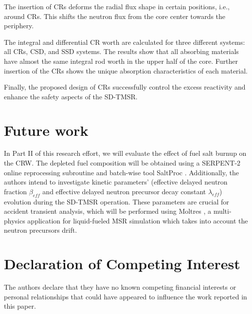The insertion of CRs deforms the radial flux shape in certain positions, i.e., around CRs. This shifts the neutron flux from the core center towards the periphery.

The integral and differential CR worth are calculated for three 
different systems: all CRs, CSD, and SSD systems. The results show 
that all absorbing materials have almost the same integral rod worth in the 
upper half of the core. Further insertion of the CRs shows the unique 
absorption characteristics of each material.

Finally, the proposed design of CRs successfully control the excess reactivity and enhance the safety aspects of the SD-TMSR.

\section{Future work}
In Part II of this research effort, we will evaluate the effect of fuel salt 
burnup on the CRW. The depleted fuel composition will be obtained using a
SERPENT-2 online reprocessing subroutine and 
batch-wise tool SaltProc \cite{rykhlevskii_milestone_2019}. Additionally, the authors intend to investigate 
kinetic parameters' (effective delayed neutron fraction $\beta_{eff}$ and 
effective delayed neutron precursor decay constant $\lambda_{eff}$) evolution 
during the SD-TMSR operation. These parameters are crucial for accident 
transient analysis, which will be performed using Moltres 
\cite{lindsay_introduction_2018}, a multi-physics application for liquid-fueled MSR 
simulation which takes into account the neutron precursors drift.

\section{Declaration of Competing Interest}

The authors declare that they have no known competing financial interests or personal relationships that could have appeared to influence the work reported in this paper.
